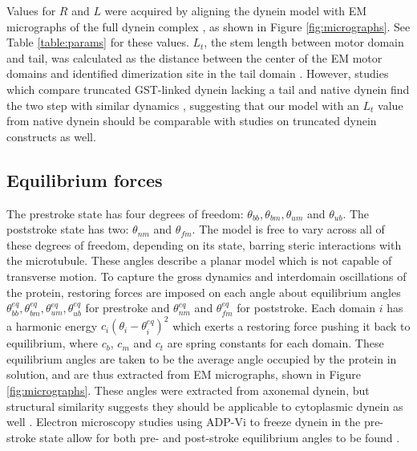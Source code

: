 \documentclass[9pt,twocolumn,twoside]{article}
\begin{document}
Values for $R$ and $L$ were acquired by aligning the dynein model with EM micrographs of the full dynein complex \cite{burgess-paper,grotjahn}, as shown in Figure \ref{fig:micrographs}. See Table \ref{table:params} for these values. $L_t$, the stem length between motor domain and tail, was calculated as the distance between the center of the EM motor domains and identified dimerization site in the tail domain \cite{}. However, studies which compare truncated GST-linked dynein lacking a tail and native dynein find the two step with similar dynamics \cite{weihongpaper-i-think}, suggesting that our model with an $L_t$ value from native dynein should be comparable with studies on truncated dynein constructs as well.

\subsection*{Equilibrium forces}
The prestroke state has four degrees of freedom: $\theta_{bb}, \theta_{bm}, \theta_{um}$ and $\theta_{ub}$. The poststroke state has two: $\theta_{nm}$ and $\theta_{fm}$. The model is free to vary across all of these degrees of freedom, depending on its state, barring steric interactions with the microtubule. These angles describe a planar model which is not capable of transverse motion. To capture the gross dynamics and interdomain oscillations of the protein, restoring forces are imposed on each angle about equilibrium angles $\theta^{eq}_{bb}, \theta^{eq}_{bm}, \theta^{eq}_{um}, \theta^{eq}_{ub}$ for prestroke and $\theta^{eq}_{nm}$ and $\theta^{eq}_{fm}$ for poststroke. Each domain $i$ has a harmonic energy $c_i\left(\theta_i-\theta^{eq}_i\right)^2$ which exerts a restoring force pushing it back to equilibrium, where $c_b$, $c_m$ and $c_t$ are spring constants for each domain. These equilibrium angles are taken to be the average angle occupied by the protein in solution, and are thus extracted from EM micrographs, shown in Figure \ref{fig:micrographs}. These angles were extracted from axonemal dynein, but structural similarity suggests they should be applicable to cytoplasmic dynein as well \cite{dynein-c-paper}. Electron microscopy studies using ADP-Vi to freeze dynein in the pre-stroke state allow for both pre- and post-stroke equilibrium angles to be found \cite{burgess-paper}.
\end{document}
